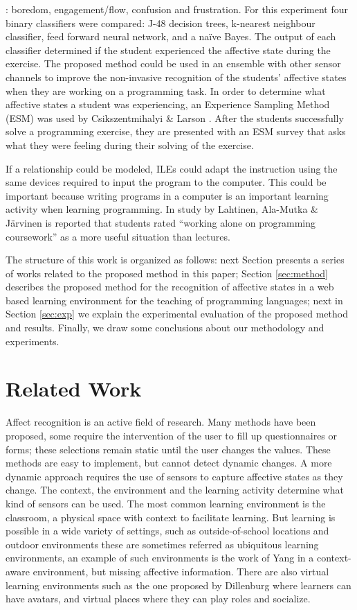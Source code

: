 \documentclass[a4paper,twoside]{article}
\begin{document}
\cite{bixler2013detecting}: boredom, engagement/flow, confusion and frustration. For this experiment
four binary classifiers were compared: J-48 decision trees, k-nearest neighbour
classifier, feed forward neural network, and a na\"ive Bayes. The output of each
classifier determined if the student experienced the affective state during the
exercise. The proposed method could be used in an ensemble with other sensor
channels to improve the non-invasive recognition of the students’ affective
states when they are working on a programming task. In order to determine what
affective states a student was experiencing, an Experience Sampling Method (ESM)
was used by Csikszentmihalyi \& Larson \cite{kubey1996experience}. After the students successfully
solve a programming exercise, they are presented with an ESM survey that asks
what they were feeling during their solving of the exercise.

If a relationship could be modeled, ILEs could adapt the instruction using the
same devices required to input the program to the computer. This could be
important because writing programs in a computer is an important learning
activity when learning programming. In study by Lahtinen, Ala-Mutka \& Järvinen
\cite{lahtinen2005study} is reported that students rated ``working alone on programming
coursework'' as a more useful situation than lectures.

The structure of this work is organized as follows: next Section 
presents a series of works related to the proposed method in this paper; Section
\ref{sec:method} describes the proposed method for the recognition of affective
states in a web based learning environment for the teaching of programming
languages; next in Section \ref{sec:exp} we explain the experimental evaluation of the
proposed method and results.
Finally, we draw some conclusions about our methodology and
experiments. 


\section{Related Work}

Affect recognition is an active field of research. Many
methods have been proposed, some require the intervention of the user to fill up
questionnaires or forms; these selections remain static until the user changes
the values. These methods are easy to implement, but cannot detect dynamic
changes.  A more dynamic approach requires the use of sensors to capture
affective states as they change. The context, the environment and the learning
activity determine what kind of sensors can be used. The most common learning
environment is the classroom, a physical space with context to facilitate
learning. But learning is possible in a wide variety of settings, such as
outside-of-school locations and outdoor environments these are sometimes
referred as ubiquitous learning environments, an example of such environments is
the work of Yang \cite{yang2006context} in a context-aware environment, but missing affective
information. There are also virtual learning environments such as the one proposed by Dillenburg
\cite{dillenbourg2002virtual}  where learners can have avatars, and virtual places
where they can play roles and socialize.
\end{document}
